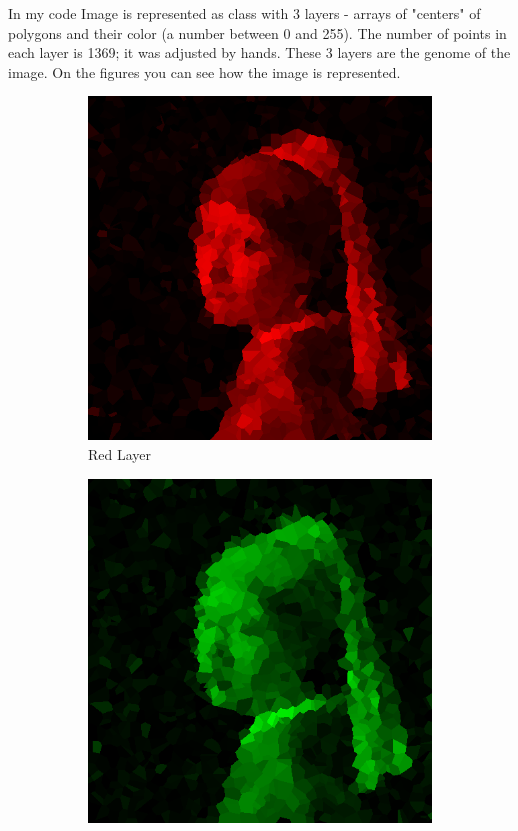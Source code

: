 \documentclass{article}
\begin{document}
In my code Image is represented as class with 3 layers - arrays of "centers" of polygons and their color (a number between 0 and 255). The number of points in each layer is 1369; it was adjusted by hands. These 3 layers are the genome of the image. On the figures you can see how the image is represented.
\begin{figure}[ht]
   	 \centering
     \begin{subfigure}[b]{0.3\textwidth}
         \centering
         \includegraphics[width=\textwidth]{latex_src/r.png}
         \caption{Red Layer}
     \end{subfigure}
     \hfill
     \begin{subfigure}[b]{0.3\textwidth}
         \centering
         \includegraphics[width=\textwidth]{latex_src/g.png}

\end{subfigure}
\end{figure}
\end{document}
